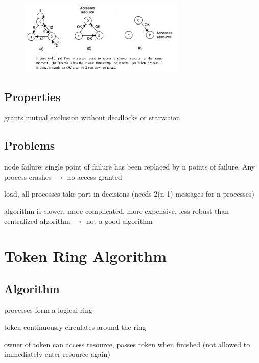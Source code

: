 \documentclass[ngerman,a4paper]{report}
\begin{document}
\begin{figure}[h]
	\centering
	\includegraphics[width=300px]{gfx/mutex-distributed.png}
	\label{img:mutex-distributed}
\end{figure}

\subsection*{Properties}
\begin{compactitem}
	\item grants mutual exclusion without deadlocks or starvation
\end{compactitem}
\subsection*{Problems}
\begin{compactitem}
	\item node failure: single point of failure has been replaced by n points of failure. Any process crashes $\rightarrow$ no access granted
    \item load, all processes take part in decisions (needs 2(n-1) messages for n processes)
	\item algorithm is slower, more complicated, more expensive, less robust than centralized algorithm $\rightarrow$ not a good algorithm
\end{compactitem}

\section{Token Ring Algorithm}

\subsection*{Algorithm}
\begin{compactitem}
	\item processes form a logical ring
	\item token continuously circulates around the ring
	\item owner of token can access resource, passes token when finished (not allowed to immediately enter resource again)
\end{compactitem}
\end{document}
